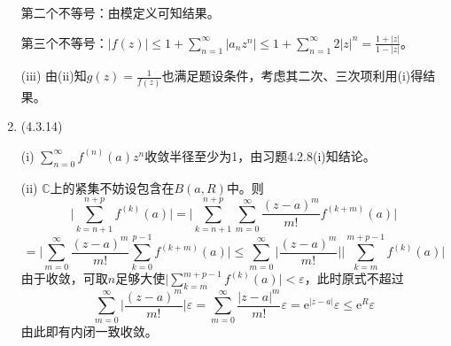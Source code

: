 \documentclass[a4paper,UTF8,fontset=windows]{ctexart}
\begin{document}
\begin{enumerate}
    第二个不等号：由模定义可知结果。
    
    第三个不等号：$|f(z)|\le1+\sum_{n=1}^\infty|a_nz^n|\le1+\sum_{n=1}^\infty2|z|^n=\frac{1+|z|}{1-|z|}$。
    
    (iii) 由(ii)知$g(z)=\frac{1}{f(z)}$也满足题设条件，考虑其二次、三次项利用(i)得结果。
    
    \item (4.3.14)
    
    (i) $\sum_{n=0}^\infty f^{(n)}(a)z^n$收敛半径至少为1，由习题4.2.8(i)知结论。
    
    (ii) $\mathbb{C}$上的紧集不妨设包含在$B(a,R)$中。则
    \[\bigg|\sum_{k=n+1}^{n+p}f^{(k)}(a)\bigg|=\bigg|\sum_{k=n+1}^{n+p}\sum_{m=0}^{\infty}\frac{(z-a)^m}{m!}f^{(k+m)}(a)\bigg|\]
    \[=\bigg|\sum_{m=0}^\infty\frac{(z-a)^m}{m!}\sum_{k=0}^{p-1}f^{(k+m)}(a)\bigg|\le\sum_{m=0}^\infty\bigg|\frac{(z-a)^m}{m!}\bigg|\bigg|\sum_{k=m}^{m+p-1}f^{(k)}(a)\bigg|\]
    由于收敛，可取$n$足够大使$\big|\sum_{k=m}^{m+p-1}f^{(k)}(a)\big|<\varepsilon$，此时原式不超过
    \[\sum_{m=0}^\infty\bigg|\frac{(z-a)^m}{m!}\bigg|\varepsilon=\sum_{m=0}^\infty\frac{|z-a|^m}{m!}\varepsilon=\mathrm{e}^{|z-a|}\varepsilon\le\mathrm{e}^R\varepsilon\]
    由此即有内闭一致收敛。    
\end{enumerate}
\end{document}
